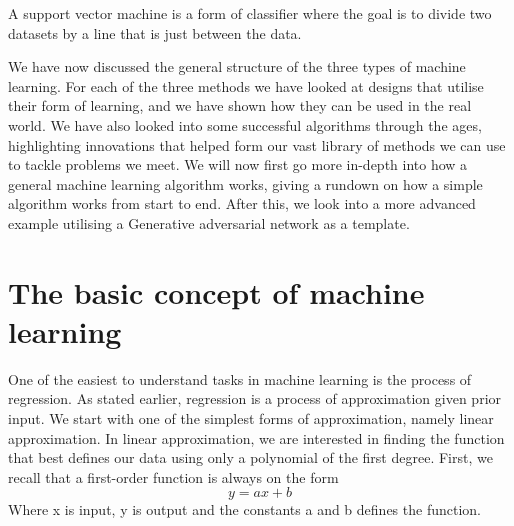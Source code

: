 A support vector machine is a form of classifier where the goal is to divide two datasets by a line that is just between the data. 


\vspace{5px} 


    
We have now discussed the general structure of the three types of machine learning. For each of the three methods we have looked at designs that utilise their form of learning, and we have shown how they can be used in the real world.
We have also looked into some successful algorithms through the ages, highlighting innovations that helped form our vast library of methods we can use to tackle problems we meet.
We will now first go more in-depth into how a general machine learning algorithm works, giving a rundown on how a simple algorithm works from start to end.
After this, we look into a more advanced example utilising a Generative adversarial network as a template.


    
\section{The basic concept of machine learning}   
One of the easiest to understand tasks in machine learning is the process of regression. As stated earlier, regression is a process of approximation given prior input.
We start with one of the simplest forms of approximation, namely linear approximation. In linear approximation, we are interested in finding the function that best defines our data using only a polynomial of the first degree.  First, we recall that a first-order function is always on the form
\begin{equation}
y = ax +b 
\end{equation}
Where x is input, y is output and the constants a and b defines the function.
    
